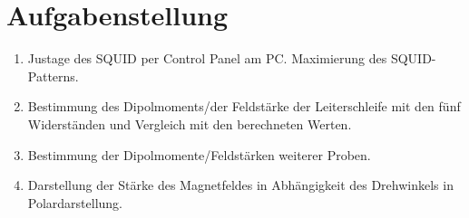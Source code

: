 \section{Aufgabenstellung}
\begin{enumerate}
 \item Justage des SQUID per Control Panel am PC. Maximierung des SQUID-Patterns.
 \item Bestimmung des Dipolmoments/der Feldstärke der Leiterschleife mit den fünf Widerständen und Vergleich mit den berechneten Werten.
 \item Bestimmung der Dipolmomente/Feldstärken weiterer Proben.
 \item Darstellung der Stärke des Magnetfeldes in Abhängigkeit des Drehwinkels in Polardarstellung.
\end{enumerate}